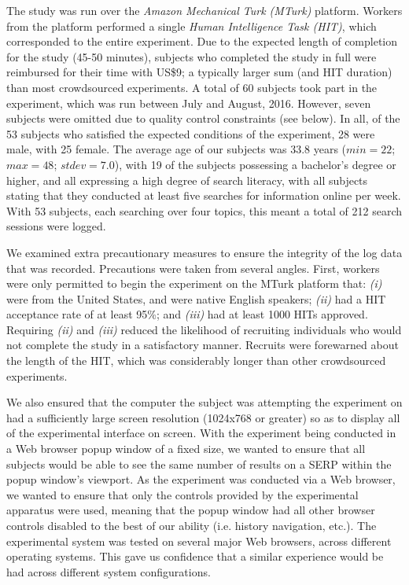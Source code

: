 The study was run over the \emph{Amazon Mechanical Turk (MTurk)} platform. Workers from the platform performed a single \emph{Human Intelligence Task (HIT)}, which corresponded to the entire experiment. Due to the expected length of completion for the study (45-50 minutes), subjects who completed the study in full were reimbursed for their time with US\$9; a typically larger sum (and HIT duration) than most crowdsourced experiments. A total of 60 subjects took part in the experiment, which was run between July and August, 2016. However, seven subjects were omitted due to quality control constraints (see below). In all, of the 53 subjects who satisfied the expected conditions of the experiment, 28 were male, with 25 female. The average age of our subjects was 33.8 years ($min=22$; $max=48$; $stdev=7.0$), with 19 of the subjects possessing a bachelor's degree or higher, and all expressing a high degree of search literacy, with all subjects stating that they conducted at least five searches for information online per week. With 53 subjects, each searching over four topics, this meant a total of 212 search sessions were logged.

We examined extra precautionary measures to ensure the integrity of the log data that was recorded. Precautions were taken from several angles. First, workers were only permitted to begin the experiment on the MTurk platform that: \emph{(i)} were from the United States, and were native English speakers; \emph{(ii)} had a HIT acceptance rate of at least 95\%; and \emph{(iii)} had at least 1000 HITs approved. Requiring \emph{(ii)} and \emph{(iii)} reduced the likelihood of recruiting individuals who would not complete the study in a satisfactory manner. Recruits were forewarned about the length of the HIT, which was considerably longer than other crowdsourced experiments.

We also ensured that the computer the subject was attempting the experiment on had a sufficiently large screen resolution (1024x768 or greater) so as to display all of the experimental interface on screen. With the experiment being conducted in a Web browser popup window of a fixed size, we wanted to ensure that all subjects would be able to see the same number of results on a SERP within the popup window's viewport. As the experiment was conducted via a Web browser, we wanted to ensure that only the controls provided by the experimental apparatus were used, meaning that the popup window had all other browser controls disabled to the best of our ability (i.e. history navigation, etc.). The experimental system was tested on several major Web browsers, across different operating systems. This gave us confidence that a similar experience would be had across different system configurations.

